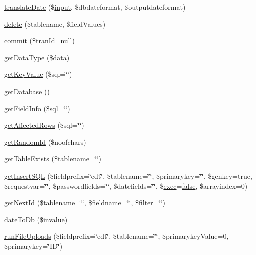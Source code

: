 \begin{DoxyCompactItemize}
\hyperlink{classDebby_a869768fbe62f60229e62cfe2fce9f1e2}{translate\+Date} (\$\hyperlink{Shape_8php_a6210da308e7ce036a6362dca3018d6db}{input}, \$dbdateformat, \$outputdateformat)
\item 
\hyperlink{classDebby_a5d6fa243fcf4b98b0c7d295136a32d5e}{delete} (\$tablename, \$field\+Values)
\item 
\hyperlink{classDebby_abd1a0612de8d8558a155fa40754fb2c6}{commit} (\$tran\+Id=null)
\item 
\hyperlink{classDebby_ac478861de694f44be2d1caceb24b42da}{get\+Data\+Type} (\$data)
\item 
\hyperlink{classDebby_ab7154d566317a9b0d9c2fbc9365b874f}{get\+Key\+Value} (\$sql=\char`\"{}\char`\"{})
\item 
\hyperlink{classDebby_a3db4be991273f352071c85ed7e0ba4ef}{get\+Database} ()
\item 
\hyperlink{classDebby_ad32fa25b945f492253439ed78641d469}{get\+Field\+Info} (\$sql=\char`\"{}\char`\"{})
\item 
\hyperlink{classDebby_a1659291aeee9847ff87329914a8ac695}{get\+Affected\+Rows} (\$sql=\char`\"{}\char`\"{})
\item 
\hyperlink{classDebby_a2d73151aa881a7d42dcdf2cd4fd4f2d8}{get\+Random\+Id} (\$noofchars)
\item 
\hyperlink{classDebby_a40081a8f7b867ea5c145fd1a69312a5c}{get\+Table\+Exists} (\$tablename=\char`\"{}\char`\"{})
\item 
\hyperlink{classDebby_a16d70533ec98b133bbedb916e7599176}{get\+Insert\+S\+Q\+L} (\$fieldprefix=\char`\"{}edt\char`\"{}, \$tablename=\char`\"{}\char`\"{}, \$primarykey=\char`\"{}\char`\"{}, \$genkey=true, \$requestvar=\char`\"{}\char`\"{}, \$passwordfields=\char`\"{}\char`\"{}, \$datefields=\char`\"{}\char`\"{}, \$\hyperlink{classDebby_a246a7d5268c855f26ce31f4088ce56e9}{exec}=\hyperlink{tina4_8php_aec2deb5590a84bee262c3bea206ae88f}{false}, \$arrayindex=0)
\item 
\hyperlink{classDebby_af7c384f77a1a616e70b936dd536e6657}{get\+Next\+Id} (\$tablename=\char`\"{}\char`\"{}, \$fieldname=\char`\"{}\char`\"{}, \$filter=\char`\"{}\char`\"{})
\item 
\hyperlink{classDebby_a9cb39569856f66218e9f0bd6271c4f64}{date\+To\+Db} (\$invalue)
\item 
\hyperlink{classDebby_a243d5ab95ac9d5857be34a7db4eb6771}{run\+File\+Uploads} (\$fieldprefix=\char`\"{}edt\char`\"{}, \$tablename=\char`\"{}\char`\"{}, \$primarykey\+Value=0, \$primarykey=\char`\"{}I\+D\char`\"{})
\item 

\end{DoxyCompactItemize}
